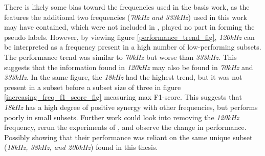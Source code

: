     
    
    
    There is likely some bias toward the frequencies used in the basis work, as the features the additional two frequencies (\textit{70kHz and 333kHz}) used in this work may have contained, which were not included in \citet{brautaset2020acoustic}, played no part in forming the pseudo labels.  However, by viewing figure \ref{performance_trend_fig}, \textit{120kHz} can be interpreted as a frequency present in a high number of low-performing subsets. The performance trend was similar to \textit{70kHz} but worse than \textit{333kHz}. This suggests that the information found in \textit{120kHz} may also be found in \textit{70kHz} and \textit{333kHz}. In the same figure, the \textit{18kHz} had the highest trend, but it was not present in a subset before a subset size of three in figure \ref{increasing_freq_f1_score_fig} measuring max F1-score. This suggests that \textit{18kHz} has a high degree of positive synergy with other frequencies, but performs poorly in small subsets. Further work could look into removing the \textit{120kHz} frequency, rerun the experiments of \citeauthor{brautaset2020acoustic}, and observe the change in performance. Possibly showing that their performance was reliant on the same unique subset (\textit{18kHz, 38kHz, and 200kHz}) found in this thesis. 

    
    
    

